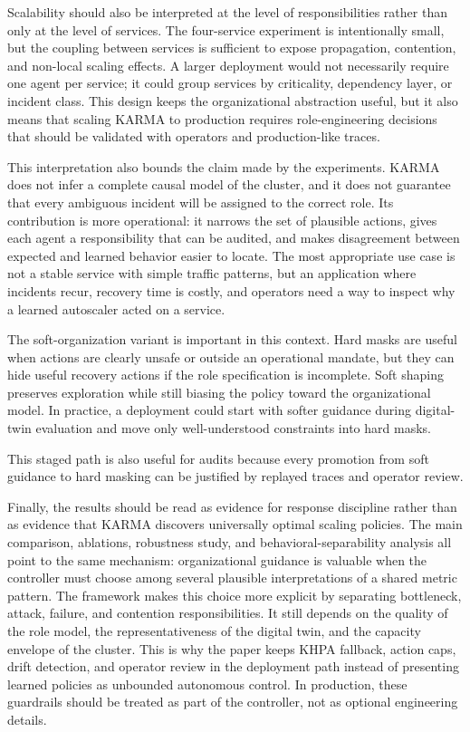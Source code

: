 \documentclass[journal]{IEEEtran}
\begin{document}
Scalability should also be interpreted at the level of responsibilities rather than only at the level of services. The four-service experiment is intentionally small, but the coupling between services is sufficient to expose propagation, contention, and non-local scaling effects. A larger deployment would not necessarily require one agent per service; it could group services by criticality, dependency layer, or incident class. This design keeps the organizational abstraction useful, but it also means that scaling KARMA to production requires role-engineering decisions that should be validated with operators and production-like traces.

This interpretation also bounds the claim made by the experiments. KARMA does not infer a complete causal model of the cluster, and it does not guarantee that every ambiguous incident will be assigned to the correct role. Its contribution is more operational: it narrows the set of plausible actions, gives each agent a responsibility that can be audited, and makes disagreement between expected and learned behavior easier to locate. The most appropriate use case is not a stable service with simple traffic patterns, but an application where incidents recur, recovery time is costly, and operators need a way to inspect why a learned autoscaler acted on a service.

The soft-organization variant is important in this context. Hard masks are useful when actions are clearly unsafe or outside an operational mandate, but they can hide useful recovery actions if the role specification is incomplete. Soft shaping preserves exploration while still biasing the policy toward the organizational model. In practice, a deployment could start with softer guidance during digital-twin evaluation and move only well-understood constraints into hard masks.

This staged path is also useful for audits because every promotion from soft guidance to hard masking can be justified by replayed traces and operator review.

Finally, the results should be read as evidence for response discipline rather than as evidence that KARMA discovers universally optimal scaling policies. The main comparison, ablations, robustness study, and behavioral-separability analysis all point to the same mechanism: organizational guidance is valuable when the controller must choose among several plausible interpretations of a shared metric pattern. The framework makes this choice more explicit by separating bottleneck, attack, failure, and contention responsibilities. It still depends on the quality of the role model, the representativeness of the digital twin, and the capacity envelope of the cluster. This is why the paper keeps KHPA fallback, action caps, drift detection, and operator review in the deployment path instead of presenting learned policies as unbounded autonomous control. In production, these guardrails should be treated as part of the controller, not as optional engineering details.
\end{document}
